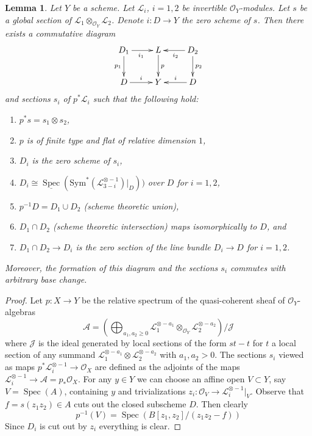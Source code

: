 \documentclass[10pt,a4paper]{amsart}
\theoremstyle{plain}
\newtheorem{lemma}[subsection]{Lemma}
\theoremstyle{definition}
\theoremstyle{remark}
\numberwithin{equation}{subsection}
\def\Spec{\mathop{\mathrm{Spec}}}
\begin{document}
\begin{lemma}
\label{lemma-decompose-section}
Let $Y$ be a scheme. Let $\mathcal{L}_i$, $i = 1, 2$ be invertible
$\mathcal{O}_Y$-modules. Let $s$ be a global section of
$\mathcal{L}_1 \otimes_{\mathcal{O}_Y} \mathcal{L}_2$.
Denote $i : D \to Y$ the zero scheme of $s$.
Then there exists a commutative diagram
$$
\xymatrix{
D_1 \ar[r]_{i_1} \ar[d]_{p_1} &
L \ar[d]^p &
D_2 \ar[l]^{i_2} \ar[d]^{p_2} \\
D \ar[r]^i &
Y &
D \ar[l]_i
}
$$
and sections $s_i$ of $p^*\mathcal{L}_i$ such that
the following hold:
\begin{enumerate}
\item $p^*s = s_1 \otimes s_2$,
\item $p$ is of finite type and flat of relative dimension $1$,
\item $D_i$ is the zero scheme of $s_i$,
\item $D_i \cong
\underline{\Spec}(\text{Sym}^*(\mathcal{L}_{3 - i}^{\otimes -1})|_D))$
over $D$ for $i = 1, 2$,
\item $p^{-1}D = D_1 \cup D_2$ (scheme theoretic union),
\item $D_1 \cap D_2$ (scheme theoretic intersection) maps
isomorphically to $D$, and
\item $D_1 \cap D_2 \to D_i$
is the zero section of the line bundle $D_i \to D$ for $i = 1, 2$.
\end{enumerate}
Moreover, the formation of this diagram and the sections $s_i$
commutes with arbitrary base change.
\end{lemma}

\begin{proof}
Let $p : X \to Y$ be the relative spectrum of the quasi-coherent
sheaf of $\mathcal{O}_Y$-algebras
$$
\mathcal{A} =
\left(\bigoplus\nolimits_{a_1, a_2 \geq 0}
\mathcal{L}_1^{\otimes -a_1} \otimes_{\mathcal{O}_Y}
\mathcal{L}_2^{\otimes -a_2}\right)/\mathcal{J}
$$
where $\mathcal{J}$ is the ideal generated by local sections of
the form $st - t$ for $t$ a local section of any summand
$\mathcal{L}_1^{\otimes -a_1} \otimes \mathcal{L}_2^{\otimes -a_2}$
with $a_1, a_2 > 0$. The sections $s_i$ viewed as maps
$p^*\mathcal{L}_i^{\otimes -1} \to \mathcal{O}_X$ are defined as the adjoints
of the maps $\mathcal{L}_i^{\otimes -1} \to \mathcal{A} = p_*\mathcal{O}_X$.
For any $y \in Y$ we can choose an affine
open $V \subset Y$, say $V = \Spec(A)$, containing $y$ and
trivializations $z_i : \mathcal{O}_V \to \mathcal{L}_i^{\otimes -1}|_V$.
Observe that $f = s(z_1z_2) \in A$ cuts out the closed subscheme $D$.
Then clearly
$$
p^{-1}(V) = \Spec(B[z_1, z_2]/(z_1 z_2 - f))
$$
Since $D_i$ is cut out by $z_i$ everything is clear.
\end{proof}
\end{document}

